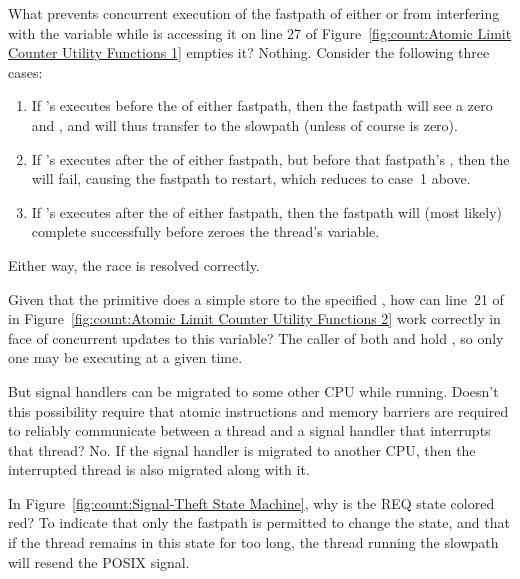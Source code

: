 \QuickQ{}
	What prevents concurrent execution of the fastpath of either
	 or  from interfering with
	the  variable while
	 is accessing it on line 27 of
	Figure~\ref{fig:count:Atomic Limit Counter Utility Functions 1}
	empties it?
\QuickA{}
	Nothing.
	Consider the following three cases:
	\begin{enumerate}
	\item	If 's  executes
		before the  of either fastpath,
		then the fastpath will see a zero  and
		, and will thus transfer to the slowpath
		(unless of course  is zero).
	\item	If 's  executes
		after the  of either fastpath,
		but before that fastpath's ,
		then the  will fail, causing the
		fastpath to restart, which reduces to case~1 above.
	\item	If 's  executes
		after the  of either fastpath,
		then the fastpath will (most likely) complete successfully
		before  zeroes the thread's
		 variable.
	\end{enumerate}
	Either way, the race is resolved correctly.

\QuickQ{}
	Given that the  primitive does a simple
	store to the specified , how can line~21 of
	 in
	Figure~\ref{fig:count:Atomic Limit Counter Utility Functions 2}
	work correctly in face of concurrent 
	updates to this variable?
\QuickA{}
	The caller of both  and
	 hold , so
	only one may be executing at a given time.

\QuickQ{}
	But signal handlers can be migrated to some other
	CPU while running.
	Doesn't this possibility require that atomic instructions
	and memory barriers are required to reliably communicate
	between a thread and a signal handler that interrupts that
	thread?
\QuickA{}
	No.
	If the signal handler is migrated to another CPU, then the
	interrupted thread is also migrated along with it.

\QuickQ{}
	In Figure~\ref{fig:count:Signal-Theft State Machine}, why is
	the REQ  state colored red?
\QuickA{}
	To indicate that only the fastpath is permitted to change the
	 state, and that if the thread remains in this
	state for too long, the thread running the slowpath will
	resend the POSIX signal.

